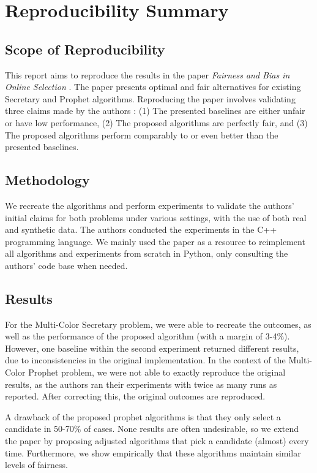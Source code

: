\section*{\centering Reproducibility Summary}

\subsection*{Scope of Reproducibility}
This report aims to reproduce the results in the paper \textit{Fairness and Bias in Online Selection} \cite{correa21}. The paper presents optimal and fair alternatives for existing Secretary and Prophet algorithms. Reproducing the paper involves validating three claims made by the authors \cite{correa21}: (1) The presented baselines are either unfair or have low performance, (2) The proposed algorithms are perfectly fair, and (3) The proposed algorithms perform comparably to or even better than the presented baselines.

\subsection*{Methodology}

We recreate the algorithms and perform experiments to validate the authors' initial claims for both problems under various settings, with the use of both real and synthetic data. The authors conducted the experiments in the C++ programming language. We mainly used the paper as a resource to reimplement all algorithms and experiments from scratch in Python, only consulting the authors' code base when needed.

\subsection*{Results}

For the Multi-Color Secretary problem, we were able to recreate the outcomes, as well as the performance of the proposed algorithm (with a margin of 3-4\%). However, one baseline within the second experiment returned different results, due to inconsistencies in the original implementation. In the context of the Multi-Color Prophet problem, we were not able to exactly reproduce the original results, as the authors ran their experiments with twice as many runs as reported. After correcting this, the original outcomes are reproduced.

A drawback of the proposed prophet algorithms is that they only select a candidate in 50-70\% of cases. None results are often undesirable, so we extend the paper by proposing adjusted algorithms that pick a candidate (almost) every time. Furthermore, we show empirically that these algorithms maintain similar levels of fairness.

